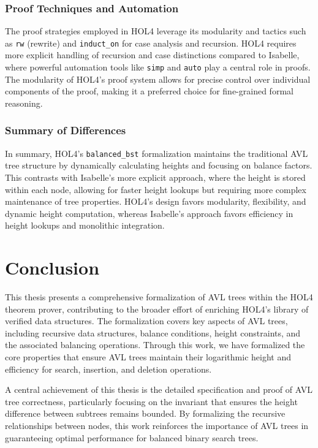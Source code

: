 \documentclass[12pt]{article}
\begin{document}
\subsubsection{Proof Techniques and Automation}
The proof strategies employed in HOL4 leverage its modularity and tactics such as \texttt{rw} (rewrite) and \texttt{induct\_on} for case analysis and recursion. HOL4 requires more explicit handling of recursion and case distinctions compared to Isabelle, where powerful automation tools like \texttt{simp} and \texttt{auto} play a central role in proofs. The modularity of HOL4’s proof system allows for precise control over individual components of the proof, making it a preferred choice for fine-grained formal reasoning.

\subsubsection{Summary of Differences}
In summary, HOL4’s \texttt{balanced\_bst} formalization maintains the traditional AVL tree structure by dynamically calculating heights and focusing on balance factors. This contrasts with Isabelle’s more explicit approach, where the height is stored within each node, allowing for faster height lookups but requiring more complex maintenance of tree properties. HOL4’s design favors modularity, flexibility, and dynamic height computation, whereas Isabelle’s approach favors efficiency in height lookups and monolithic integration.


\section{Conclusion}
This thesis presents a comprehensive formalization of AVL trees within the HOL4 theorem prover, contributing to the broader effort of enriching HOL4's library of verified data structures. The formalization covers key aspects of AVL trees, including recursive data structures, balance conditions, height constraints, and the associated balancing operations. Through this work, we have formalized the core properties that ensure AVL trees maintain their logarithmic height and efficiency for search, insertion, and deletion operations.

A central achievement of this thesis is the detailed specification and proof of AVL tree correctness, particularly focusing on the invariant that ensures the height difference between subtrees remains bounded. By formalizing the recursive relationships between nodes, this work reinforces the importance of AVL trees in guaranteeing optimal performance for balanced binary search trees.
\end{document}
